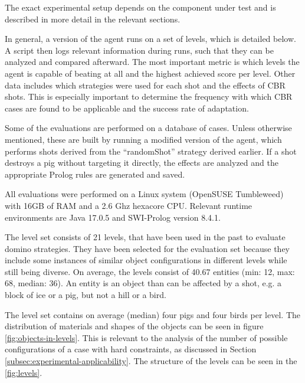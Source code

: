 The exact experimental setup depends on the component under test and is described in more detail in the relevant sections.

In general, a version of the agent runs on a set of levels, which is detailed below.
A script then logs relevant information during runs, such that they can be analyzed and compared afterward.
The most important metric is which levels the agent is capable of beating at all and the highest achieved score per level.
Other data includes which strategies were used for each shot and the effects of \ac{CBR} shots.
This is especially important to determine the frequency with which \acs{CBR} cases are found to be applicable and the success rate of adaptation.

Some of the evaluations are performed on a database of cases. Unless otherwise mentioned, these are built by running a modified version of the agent, which performs shots derived from the ``randomShot'' strategy derived earlier. If a shot destroys a pig without targeting it directly, the effects are analyzed and the appropriate Prolog rules are generated and saved.

All evaluations were performed on a Linux system (OpenSUSE Tumbleweed) with 16GB of RAM and a 2.6 Ghz hexacore CPU. Relevant runtime environments are Java 17.0.5 and SWI-Prolog version 8.4.1.

The level set consists of 21 levels, that have been used in the past to evaluate domino strategies. They have been selected for the evaluation set because they include some instances of similar object configurations in different levels while still being diverse.
On average, the levels consist of 40.67 entities (min: 12, max: 68, median: 36). An entity is an object than can be affected by a shot, e.g. a block of ice or a pig, but not a hill or a bird.

The level set contains on average (median) four pigs and four birds per level. 
The distribution of materials and shapes of the objects can be seen in figure \ref{fig:objects-in-levels}. 
This is relevant to the analysis of the number of possible configurations of a case with hard constraints, as discussed in Section \ref{subsec:experimental-applicability}.
The structure of the levels can be seen in the \ref{fig:levels}.

